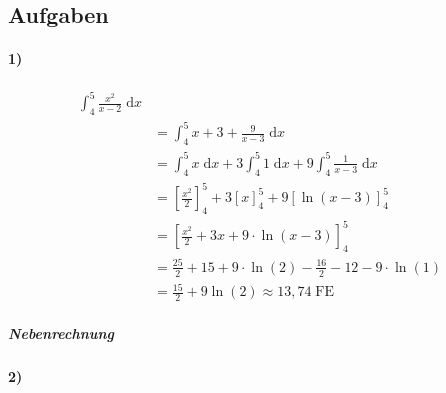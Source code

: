 \subsection{Aufgaben}

\paragraph{1)}

\begin{align*}
	\int_4^5 \frac{x^2}{x-2} \;\mathrm{d}x                                                              \\
	 & = \int_4^5 x+3 + \frac{9}{x-3} \;\mathrm{d}x                                                     \\
	 & = \int_4^5 x \;\mathrm{d}x + 3 \int_4^5 1 \;\mathrm{d}x + 9 \int_4^5 \frac{1}{x-3} \;\mathrm{d}x \\
	 & = {\left[ \frac{x^2}{2} \right]}_4^5 + 3 {[x]}_4^5 + 9 {[\ln (x-3)]}_4^5                         \\
	 & = {\left[ \frac{x^2}{2} + 3x + 9 \cdot \ln(x-3) \right]}_4^5                                     \\
	 & = \frac{25}{2} + 15 + 9 \cdot \ln(2) - \frac{16}{2} - 12 -9 \cdot \ln(1)                         \\
	 & = \frac{15}{2} + 9 \ln(2) \approx 13,74\;\mathrm{FE}
\end{align*}


\subparagraph{Nebenrechnung}


\paragraph{2)}

